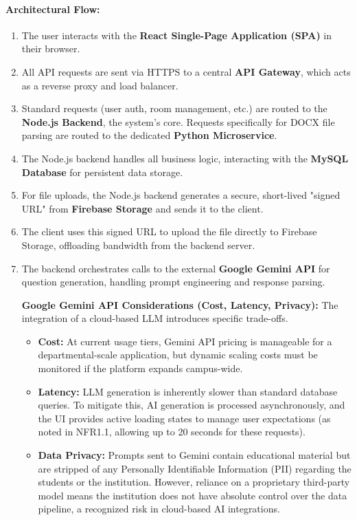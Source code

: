 \paragraph{Architectural Flow:}
\begin{enumerate}
    \item The user interacts with the \textbf{React Single-Page Application (SPA)} in their browser.
    \item All API requests are sent via HTTPS to a central \textbf{API Gateway}, which acts as a reverse proxy and load balancer.
    \item Standard requests (user auth, room management, etc.) are routed to the \textbf{Node.js Backend}, the system's core. Requests specifically for DOCX file parsing are routed to the dedicated \textbf{Python Microservice}.
    \item The Node.js backend handles all business logic, interacting with the \textbf{MySQL Database} for persistent data storage.
    \item For file uploads, the Node.js backend generates a secure, short-lived "signed URL" from \textbf{Firebase Storage} and sends it to the client.
    \item The client uses this signed URL to upload the file directly to Firebase Storage, offloading bandwidth from the backend server.
    \item The backend orchestrates calls to the external \textbf{Google Gemini API} for question generation, handling prompt engineering and response parsing.

\textbf{Google Gemini API Considerations (Cost, Latency, Privacy):} The integration of a cloud-based LLM introduces specific trade-offs. 
\begin{itemize}
    \item \textbf{Cost:} At current usage tiers, Gemini API pricing is manageable for a departmental-scale application, but dynamic scaling costs must be monitored if the platform expands campus-wide.
    \item \textbf{Latency:} LLM generation is inherently slower than standard database queries. To mitigate this, AI generation is processed asynchronously, and the UI provides active loading states to manage user expectations (as noted in NFR1.1, allowing up to 20 seconds for these requests).
    \item \textbf{Data Privacy:} Prompts sent to Gemini contain educational material but are stripped of any Personally Identifiable Information (PII) regarding the students or the institution. However, reliance on a proprietary third-party model means the institution does not have absolute control over the data pipeline, a recognized risk in cloud-based AI integrations.
\end{itemize}
\end{enumerate}

